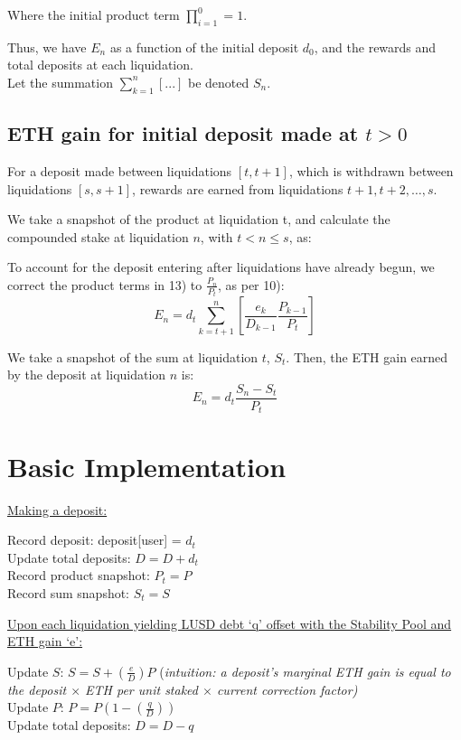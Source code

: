 \documentclass[reqno]{article}
\begin{document}
\bigskip
Where the initial product term $\displaystyle\prod^0_{i=1}=1$.

\bigskip
Thus, we have $E_n$ as a function of the initial deposit $d_0$, and the rewards and total deposits at each liquidation.\\
Let the summation $\displaystyle\sum^n_{k=1}[...]$ be denoted $S_n$.

\bigskip
\subsection{ETH gain for initial deposit made at $t>0$}

\bigskip
For a deposit made between liquidations $[t, t+1]$, which is withdrawn between liquidations $[s, s+1]$, rewards are earned from liquidations $t+1, t+2, \ldots, s$.

We take a snapshot of the product at liquidation t, and calculate the compounded stake at liquidation $n$, with $t < n \leq s$, as:

\bigskip
To account for the deposit entering after liquidations have already begun, we correct the product terms in 13) to $\frac{P_n}{P_t}$, as per 10):
\begin{equation} 
    E_n = d_t\sum^n_{k=t+1}\left[\frac{e_k}{D_{k-1}}\frac{P_{k-1}}{P_t}\right]
\end{equation}

\bigskip
We take a snapshot of the sum at liquidation $t$, {$S_t$}. Then, the ETH gain earned by the deposit at liquidation $n$ is:
\begin{equation} 
E_n=d_t\frac{S_n-S_t}{P_t}
\end{equation}

\bigskip
\section{Basic Implementation}
\underline{Making a deposit:}

Record deposit: deposit[user] = {$d_t$}\\
Update total deposits: {$D = D + d_t$}\\
Record product snapshot: {$P_t = P$}\\
Record sum snapshot: {$S_t = S$}

\bigskip
\underline{Upon each liquidation yielding LUSD debt ‘q’ offset with the Stability Pool and ETH gain ‘e’:}

Update $S$: {$S = S + (\frac{e}{D})P$} (\textit{intuition: a deposit’s marginal ETH gain is equal to the deposit $\times$ ETH per unit staked $\times$ current correction factor)}\\
Update $P$: {$P = P(1- (\frac{q}{D}))$}\\
Update total deposits: {$D = D - q$}
\end{document}
